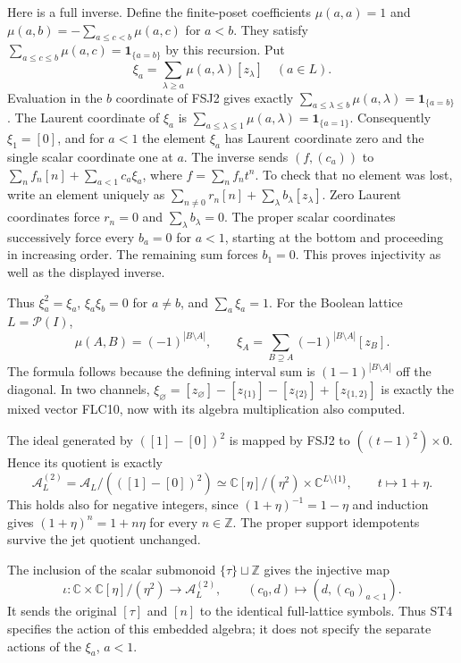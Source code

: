 \documentclass[11pt]{article}
\begin{document}
Here is a full inverse. Define the finite-poset coefficients
$\mu(a,a)=1$ and
$\mu(a,b)=-\sum_{a\le c<b}\mu(a,c)$ for $a<b$.
They satisfy $\sum_{a\le c\le b}\mu(a,c)=\mathbf1_{\{a=b\}}$
by this recursion. Put
\[
\xi_a=\sum_{\lambda\ge a}\mu(a,\lambda)[z_\lambda]
\quad(a\in L).
\tag{FSJ3}
\]
Evaluation in the $b$ coordinate of FSJ2 gives exactly
$\sum_{a\le\lambda\le b}\mu(a,\lambda)=\mathbf1_{\{a=b\}}$.
The Laurent coordinate of $\xi_a$ is
$\sum_{a\le\lambda\le1}\mu(a,\lambda)=\mathbf1_{\{a=1\}}$.
Consequently $\xi_1=[0]$, and for $a<1$ the element $\xi_a$
has Laurent coordinate zero and the single scalar coordinate one
at $a$. The inverse sends $(f,(c_a))$ to
$\sum_n f_n[n]+\sum_{a<1}c_a\xi_a$, where
$f=\sum_n f_nt^n$. To check that no element was lost, write an
element uniquely as $\sum_{n\ne0}r_n[n]+\sum_\lambda b_\lambda[z_\lambda]$.
Zero Laurent coordinates force $r_n=0$ and $\sum_\lambda b_\lambda=0$.
The proper scalar coordinates successively force every $b_a=0$
for $a<1$, starting at the bottom and proceeding in increasing order.
The remaining sum forces $b_1=0$. This proves injectivity as well
as the displayed inverse.

Thus $\xi_a^2=\xi_a$, $\xi_a\xi_b=0$ for $a\ne b$, and
$\sum_a\xi_a=1$. For the Boolean lattice $L=\mathcal P(I)$,
\[
\mu(A,B)=(-1)^{|B\setminus A|},\qquad
\xi_A=\sum_{B\supseteq A}(-1)^{|B\setminus A|}[z_B].
\tag{FSJ4}
\]
The formula follows because the defining interval sum is
$(1-1)^{|B\setminus A|}$ off the diagonal. In two channels,
$\xi_\varnothing=[z_\varnothing]-[z_{\{1\}}]
-[z_{\{2\}}]+[z_{\{1,2\}}]$ is exactly the mixed vector FLC10,
now with its algebra multiplication also computed.

The ideal generated by $([1]-[0])^2$ is mapped by FSJ2 to
$((t-1)^2)\times0$. Hence its quotient is exactly
\[
\mathcal A_L^{(2)}
 =\mathcal A_L/(([1]-[0])^2)
 \simeq \mathbb C[\eta]/(\eta^2)\times\mathbb C^{L\setminus\{1\}},
\qquad t\longmapsto1+\eta.
\tag{FSJ5}
\]
This holds also for negative integers, since
$(1+\eta)^{-1}=1-\eta$ and induction gives
$(1+\eta)^n=1+n\eta$ for every $n\in\mathbb Z$.
The proper support idempotents survive the jet quotient unchanged.

The inclusion of the scalar submonoid $\{\tau\}\sqcup\mathbb Z$
gives the injective map
\[
\iota:\mathbb C\times\mathbb C[\eta]/(\eta^2)
 \longrightarrow\mathcal A_L^{(2)},\qquad
(c_0,d)\longmapsto(d,(c_0)_{a<1}).
\tag{FSJ6}
\]
It sends the original $[\tau]$ and $[n]$ to the identical full-lattice
symbols. Thus ST4 specifies the action of this embedded algebra;
it does not specify the separate actions of the $\xi_a$, $a<1$.
\end{document}
